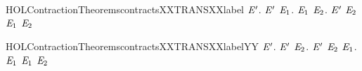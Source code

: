 \newcommand{\HOLContractionTheoremscontractsXXTRANS}{\UseVerbatim{HOLContractionTheoremscontractsXXTRANS}}
\begin{SaveVerbatim}{HOLContractionTheoremscontractsXXTRANSXXlabel}
\HOLTokenTurnstile{} \HOLSymConst{\HOLTokenForall{}} \ensuremath{\HOLBoundVar{E}\sp{\prime{}}}.
       \ensuremath{\HOLBoundVar{E}\sp{\prime{}}} \HOLSymConst{\HOLTokenImp{}}
     \HOLSymConst{\HOLTokenForall{}} \ensuremath{\HOLBoundVar{E}\sb{\mathrm{1}}}.
        \HOLTokenTransBegin{} \HOLTokenTransEnd \ensuremath{\HOLBoundVar{E}\sb{\mathrm{1}}} \HOLSymConst{\HOLTokenImp{}} \HOLSymConst{\HOLTokenExists{}}\ensuremath{\HOLBoundVar{E}\sb{\mathrm{2}}}. \ensuremath{\HOLBoundVar{E}\sp{\prime{}}} \HOLTokenTransBegin{} \HOLTokenTransEnd \ensuremath{\HOLBoundVar{E}\sb{\mathrm{2}}} \HOLSymConst{\HOLTokenConj{}} \ensuremath{\HOLBoundVar{E}\sb{\mathrm{1}}}  \ensuremath{\HOLBoundVar{E}\sb{\mathrm{2}}}
\end{SaveVerbatim}
\newcommand{\HOLContractionTheoremscontractsXXTRANSXXlabel}{\UseVerbatim{HOLContractionTheoremscontractsXXTRANSXXlabel}}
\begin{SaveVerbatim}{HOLContractionTheoremscontractsXXTRANSXXlabelYY}
\HOLTokenTurnstile{} \HOLSymConst{\HOLTokenForall{}} \ensuremath{\HOLBoundVar{E}\sp{\prime{}}}.
       \ensuremath{\HOLBoundVar{E}\sp{\prime{}}} \HOLSymConst{\HOLTokenImp{}}
     \HOLSymConst{\HOLTokenForall{}} \ensuremath{\HOLBoundVar{E}\sb{\mathrm{2}}}.
       \ensuremath{\HOLBoundVar{E}\sp{\prime{}}} \HOLTokenTransBegin{} \HOLTokenTransEnd \ensuremath{\HOLBoundVar{E}\sb{\mathrm{2}}} \HOLSymConst{\HOLTokenImp{}} \HOLSymConst{\HOLTokenExists{}}\ensuremath{\HOLBoundVar{E}\sb{\mathrm{1}}}.  \HOLTokenWeakTransBegin{} \HOLTokenWeakTransEnd \ensuremath{\HOLBoundVar{E}\sb{\mathrm{1}}} \HOLSymConst{\HOLTokenConj{}}  \ensuremath{\HOLBoundVar{E}\sb{\mathrm{1}}} \ensuremath{\HOLBoundVar{E}\sb{\mathrm{2}}}
\end{SaveVerbatim}
\newcommand{\HOLContractionTheoremscontractsXXTRANSXXlabelYY}{\UseVerbatim{HOLContractionTheoremscontractsXXTRANSXXlabelYY}}
